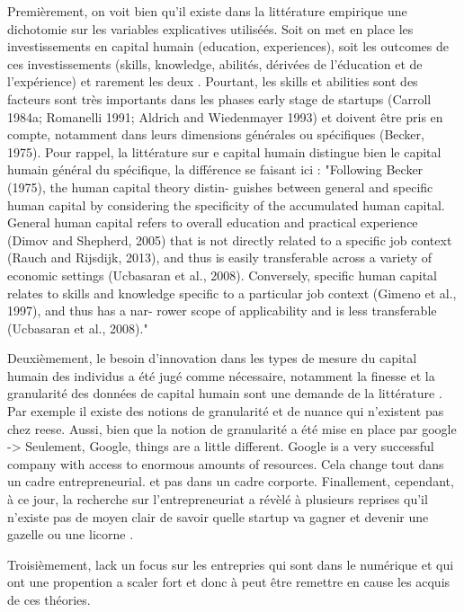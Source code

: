 \documentclass[12pt]{article}
\begin{document}
Premièrement, on voit bien qu'il existe dans la littérature empirique une dichotomie sur les variables explicatives utiliséés. Soit on met en place les investissements en capital humain (education, experiences), soit les outcomes de ces investissements (skills, knowledge, abilités, dérivées de l'éducation et de l'expérience) et rarement les deux \citet{becker1964human, unger2011human, marvel2016human, reese2020should}. Pourtant, les skills et abilities sont des facteurs sont très importants dans les phases early stage de startups (Carroll 1984a; Romanelli 1991; Aldrich and Wiedenmayer 1993) et doivent être pris en compte, notamment dans leurs dimensions générales ou spécifiques (Becker, 1975). Pour rappel, la littérature sur e capital humain distingue bien le capital humain général du spécifique, la différence se faisant ici :
"Following Becker (1975), the human capital theory distin- guishes between general and specific human capital by considering the specificity of the accumulated human capital. General human capital refers to overall education and practical experience (Dimov and Shepherd, 2005) that is not directly related to a specific job context (Rauch and Rijsdijk, 2013), and thus is easily transferable across a variety of economic settings (Ucbasaran et al., 2008). Conversely, specific human capital relates to skills and knowledge specific to a particular job context (Gimeno et al., 1997), and thus has a nar- rower scope of applicability and is less transferable (Ucbasaran et al., 2008)."

Deuxièmement, le besoin d'innovation dans les types de mesure du capital humain des individus a été jugé comme nécessaire, notamment la finesse et la granularité des données de capital humain sont une demande de la littérature \citep{marvel2016human}. Par exemple il existe des notions de granularité et de nuance qui n'existent pas chez reese. Aussi, bien que la notion de granularité a été mise en place par google -> Seulement, Google, things are a little different. Google is a very successful company with access to enormous amounts of resources. Cela change tout dans un cadre entrepreneurial. et pas dans un cadre corporte. Finallement, cependant, à ce jour, la recherche sur l'entrepreneuriat a révèlé à plusieurs reprises qu'il n'existe pas de moyen clair de savoir quelle startup va gagner et devenir une gazelle ou une licorne \citep{aldrich2018unicorns}.

Troisièmement, lack un focus sur les entrepries qui sont dans le numérique et qui ont une propention a scaler fort et donc à peut être remettre en cause les acquis de ces théories.
\end{document}
